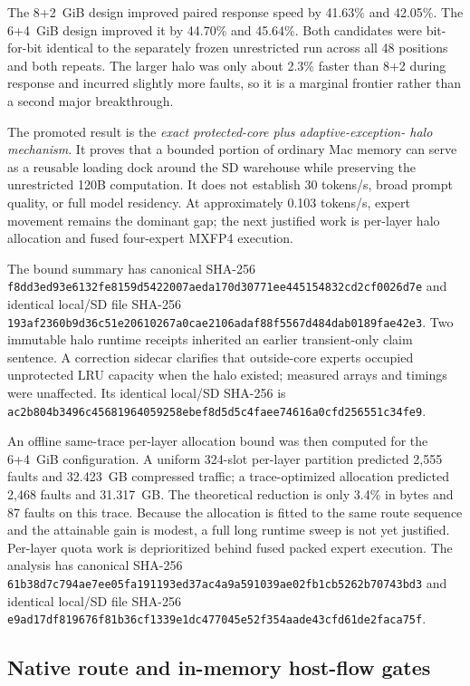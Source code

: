 The 8+2~GiB design improved paired response speed by 41.63\% and 42.05\%.
The 6+4~GiB design improved it by 44.70\% and 45.64\%.  Both candidates were
bit-for-bit identical to the separately frozen unrestricted run across all 48
positions and both repeats.  The larger halo was only about 2.3\% faster than
8+2 during response and incurred slightly more faults, so it is a marginal
frontier rather than a second major breakthrough.

The promoted result is the \emph{exact protected-core plus adaptive-exception-
halo mechanism}.  It proves that a bounded portion of ordinary Mac memory can
serve as a reusable loading dock around the SD warehouse while preserving the
unrestricted 120B computation.  It does not establish 30 tokens/s, broad prompt
quality, or full model residency.  At approximately 0.103 tokens/s, expert
movement remains the dominant gap; the next justified work is per-layer halo
allocation and fused four-expert MXFP4 execution.

The bound summary has canonical SHA-256
\texttt{f8dd3ed93e6132fe8159d5422007aeda170d30771ee445154832cd2cf0026d7e}
and identical local/SD file SHA-256
\texttt{193af2360b9d36c51e20610267a0cae2106adaf88f5567d484dab0189fae42e3}.
Two immutable halo runtime receipts inherited an earlier transient-only claim
sentence.  A correction sidecar clarifies that outside-core experts occupied
unprotected LRU capacity when the halo existed; measured arrays and timings
were unaffected.  Its identical local/SD SHA-256 is
\texttt{ac2b804b3496c45681964059258ebef8d5d5c4faee74616a0cfd256551c34fe9}.

An offline same-trace per-layer allocation bound was then computed for the
6+4~GiB configuration.  A uniform 324-slot per-layer partition predicted 2,555
faults and 32.423~GB compressed traffic; a trace-optimized allocation predicted
2,468 faults and 31.317~GB.  The theoretical reduction is only 3.4\% in bytes
and 87 faults on this trace.  Because the allocation is fitted to the same
route sequence and the attainable gain is modest, a full long runtime sweep is
not yet justified.  Per-layer quota work is deprioritized behind fused packed
expert execution.  The analysis has canonical SHA-256
\texttt{61b38d7c794ae7ee05fa191193ed37ac4a9a591039ae02fb1cb5262b70743bd3}
and identical local/SD file SHA-256
\texttt{e9ad17df819676f81b36cf1339e1dc477045e52f354aade43cfd61de2faca75f}.

\subsection{Native route and in-memory host-flow gates}

